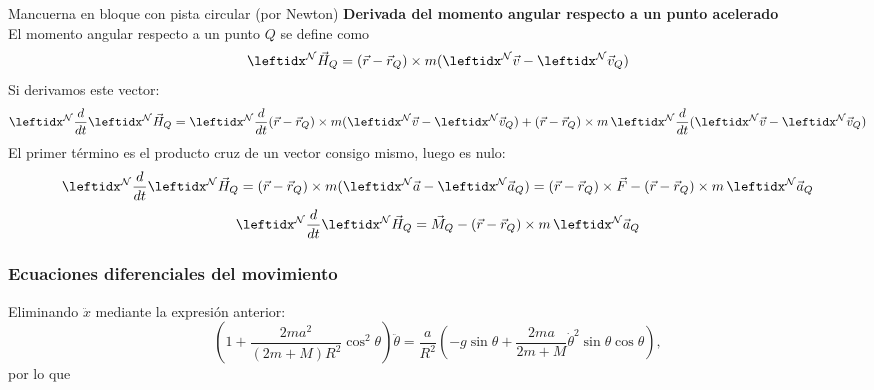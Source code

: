 \begin{solucion}{Mancuerna en bloque con pista circular (por Newton)}
\textbf{Derivada del momento angular respecto a un punto acelerado}\\
El momento angular respecto a un punto $Q$ se define como
$$\marc{\vec{H}_Q}{N}{}=(\vec{r}-\vec{r}_Q)\times m(\marc{\vec{v}}{N}{}-\marc{\vec{v}_Q}{N}{})$$
Si derivamos este vector:
$$\der{\marc{\vec{H}_Q}{N}{}}{N}{}=\der{(\vec{r}-\vec{r}_Q)}{N}{}\times m(\marc{\vec{v}}{N}{}-\marc{\vec{v}_Q}{N}{})+(\vec{r}-\vec{r}_Q)\times m\,\der{(\marc{\vec{v}}{N}{}-\marc{\vec{v}_Q}{N}{})}{N}{}$$
El primer término es el producto cruz de un vector consigo mismo, luego es nulo:
$$\der{\marc{\vec{H}_Q}{N}{}}{N}{}=(\vec{r}-\vec{r}_Q)\times m(\marc{\vec{a}}{N}{}-\marc{\vec{a}_Q}{N}{})=(\vec{r}-\vec{r}_Q)\times \vec{F}-(\vec{r}-\vec{r}_Q)\times m\,\marc{\vec{a}_Q}{N}{}$$
$$\der{\marc{\vec{H}_Q}{N}{}}{N}{}=\vec{M}_Q-(\vec{r}-\vec{r}_Q)\times m\,\marc{\vec{a}_Q}{N}{}$$

\subsubsection*{Ecuaciones diferenciales del movimiento}
Eliminando $\ddot{x}$ mediante la expresión anterior:
$$\left(1+\frac{2ma^2}{(2m+M)R^2}\cos^2\theta\right)\ddot{\theta}
= \frac{a}{R^2}\left(-g\sin\theta+\frac{2ma}{2m+M}\dot{\theta}^2\sin\theta\cos\theta\right),$$
por lo que


\end{solucion}
